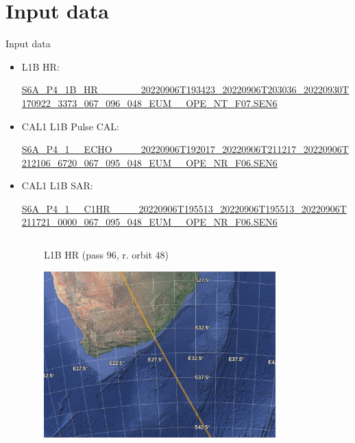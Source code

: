 \documentclass[compress,8pt]{beamer}
\begin{document}
\section{Input data}
\begin{frame}{Input data}

\small 
\begin{itemize}
 \item L1B HR: 
 
 \url{S6A_P4_1B_HR______20220906T193423_20220906T203036_20220930T170922_3373_067_096_048_EUM__OPE_NT_F07.SEN6}

\item CAL1 L1B Pulse CAL: 

\url{S6A_P4_1__ECHO____20220906T192017_20220906T211217_20220906T212106_6720_067_095_048_EUM__OPE_NR_F06.SEN6}

\item CAL1 L1B SAR: 

\url{S6A_P4_1__C1HR____20220906T195513_20220906T195513_20220906T211721_0000_067_095_048_EUM__OPE_NR_F06.SEN6}

\end{itemize}


\smallskip

\begin{columns}
\begin{column}{0.45\textwidth}\centering

$\qquad\qquad${\small L1B HR (pass $96$, r. orbit $48$)}

   $\qquad\qquad$\includegraphics[width=0.7\textwidth]{fig/test_track}
\end{column}
\begin{column}{0.45\textwidth}\centering


\end{column}
\end{columns}
\end{frame}
\end{document}
